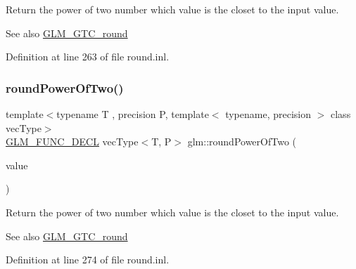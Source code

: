 Return the power of two number which value is the closet to the input value.

\begin{DoxySeeAlso}{See also}
\mbox{\hyperlink{group__gtc__round}{G\+L\+M\+\_\+\+G\+T\+C\+\_\+round}} 
\end{DoxySeeAlso}


Definition at line 263 of file round.\+inl.

\mbox{\label{group__gtc__round_gae95be3b384f3bbd00c6c1cf0a1f96485}} 
\subsubsection{\texorpdfstring{roundPowerOfTwo()}{roundPowerOfTwo()}\hspace{0.1cm}{\footnotesize\ttfamily [2/2]}}
{\footnotesize\ttfamily template$<$typename T , precision P, template$<$ typename, precision $>$ class vec\+Type$>$ \\
\mbox{\hyperlink{setup_8hpp_ab2d052de21a70539923e9bcbf6e83a51}{G\+L\+M\+\_\+\+F\+U\+N\+C\+\_\+\+D\+E\+CL}} vec\+Type$<$T, P$>$ glm\+::round\+Power\+Of\+Two (\begin{DoxyParamCaption}\item[{vec\+Type$<$ T, P $>$ const \&}]{value }\end{DoxyParamCaption})}

Return the power of two number which value is the closet to the input value.

\begin{DoxySeeAlso}{See also}
\mbox{\hyperlink{group__gtc__round}{G\+L\+M\+\_\+\+G\+T\+C\+\_\+round}} 
\end{DoxySeeAlso}


Definition at line 274 of file round.\+inl.

